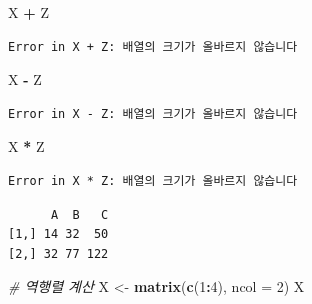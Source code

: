 \documentclass[11pt,a4paper]{book}
\newenvironment{Shaded}{\begin{snugshade}}{\end{snugshade}}
\newcommand{\KeywordTok}[1]{\textcolor[rgb]{0.13,0.29,0.53}{\textbf{#1}}}
\newcommand{\DataTypeTok}[1]{\textcolor[rgb]{0.13,0.29,0.53}{#1}}
\newcommand{\DecValTok}[1]{\textcolor[rgb]{0.00,0.00,0.81}{#1}}
\newcommand{\StringTok}[1]{\textcolor[rgb]{0.31,0.60,0.02}{#1}}
\newcommand{\CommentTok}[1]{\textcolor[rgb]{0.56,0.35,0.01}{\textit{#1}}}
\newcommand{\OperatorTok}[1]{\textcolor[rgb]{0.81,0.36,0.00}{\textbf{#1}}}
\newcommand{\NormalTok}[1]{#1}
\theoremstyle{definition}
\theoremstyle{definition}
\theoremstyle{definition}
\theoremstyle{remark}
\begin{document}
\begin{Shaded}
\begin{Highlighting}[]
\NormalTok{X }\OperatorTok{+}\StringTok{ }\NormalTok{Z}
\end{Highlighting}
\end{Shaded}

\begin{verbatim}
Error in X + Z: 배열의 크기가 올바르지 않습니다
\end{verbatim}

\begin{Shaded}
\begin{Highlighting}[]
\NormalTok{X }\OperatorTok{-}\StringTok{ }\NormalTok{Z}
\end{Highlighting}
\end{Shaded}

\begin{verbatim}
Error in X - Z: 배열의 크기가 올바르지 않습니다
\end{verbatim}

\begin{Shaded}
\begin{Highlighting}[]
\NormalTok{X }\OperatorTok{*}\StringTok{ }\NormalTok{Z}
\end{Highlighting}
\end{Shaded}

\begin{verbatim}
Error in X * Z: 배열의 크기가 올바르지 않습니다
\end{verbatim}

\begin{Shaded}
\end{Shaded}

\begin{verbatim}
      A  B   C
[1,] 14 32  50
[2,] 32 77 122
\end{verbatim}

\begin{Shaded}
\begin{Highlighting}[]
\CommentTok{# 역행렬 계산}
\NormalTok{X <-}\StringTok{ }\KeywordTok{matrix}\NormalTok{(}\KeywordTok{c}\NormalTok{(}\DecValTok{1}\OperatorTok{:}\DecValTok{4}\NormalTok{), }\DataTypeTok{ncol =} \DecValTok{2}\NormalTok{)}
\NormalTok{X}
\end{Highlighting}
\end{Shaded}
\end{document}
